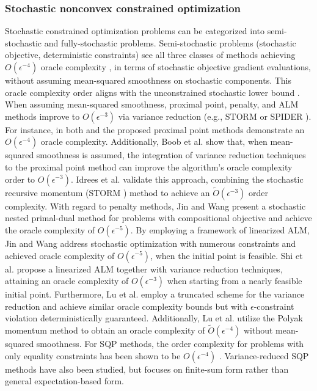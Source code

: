 \documentclass[11pt]{article}
\begin{document}
\subsubsection*{Stochastic nonconvex constrained optimization}
Stochastic constrained optimization problems can be categorized into semi-stochastic  and fully-stochastic problems.
Semi-stochastic problems (stochastic objective, deterministic constraints) see all three classes of methods  achieving \(O(\epsilon^{-4})\) oracle complexity \cite{boob2023stochastic,curtis2024worst,lu2024variance}, in terms of stochastic objective gradient evaluations, without assuming mean-squared  smoothness on stochastic components. This oracle complexity order aligns with the unconstrained stochastic lower bound \cite{arjevani2023lower}. When assuming  mean-squared smoothness, proximal point, penalty, and ALM methods improve to $O(\epsilon^{-3})$ via variance reduction (e.g., STORM  \cite{cutkosky2019momentum} or SPIDER \cite{fang2018spider}). 
For instance, in both \cite{ma2020quadratically} and  \cite{boob2023stochastic} the proposed proximal point methods demonstrate an \(O(\epsilon^{-4})\) oracle complexity.
Additionally, Boob et al. \cite{boob2025level} show that, when mean-squared smoothness is assumed, the integration of variance reduction techniques to the proximal point method can improve the algorithm’s oracle complexity order to \(O(\epsilon^{-3})\). Idrees et al. \cite{idrees2024constrained} validate this approach, combining the stochastic recursive momentum (STORM \cite{cutkosky2019momentum}) method to achieve an \(\tilde O(\epsilon^{-3})\) order complexity. 
{With regard to} penalty methods, Jin and Wang \cite{jin2025stochastic}  present a stochastic nested primal-dual method for problems with compositional objective and achieve the oracle complexity of $O(\epsilon^{-5})$. By employing a framework of linearized ALM, Jin and Wang \cite{jin2022stochastic} address stochastic optimization with numerous constraints and achieved oracle complexity of  \(O(\epsilon^{-5})\),  when the initial point is feasible. Shi et al. \cite{shi2025momentum} propose a linearized ALM {together with variance reduction techniques}, attaining an oracle complexity of  \(O(\epsilon^{-3})\) when starting from a nearly feasible initial point. Furthermore, Lu et al. \cite{lu2024variance} employ a truncated scheme for the variance reduction and achieve similar oracle complexity bounds but with $\epsilon$-constraint violation deterministically guaranteed. Additionally, Lu et al. \cite{lu2024variance} utilize the Polyak momentum method to obtain an oracle complexity of \(\tilde O(\epsilon^{-4})\) without mean-squared smoothness. For SQP methods, the order complexity for problems with only equality constraints has been shown to be \(O(\epsilon^{-4})\) \cite{curtis2024worst}. Variance-reduced SQP methods \cite{berahas2023accelerating} have also been studied, but {\cite{berahas2023accelerating} focuses} on finite-sum form rather than general expectation-based form.
\end{document}
